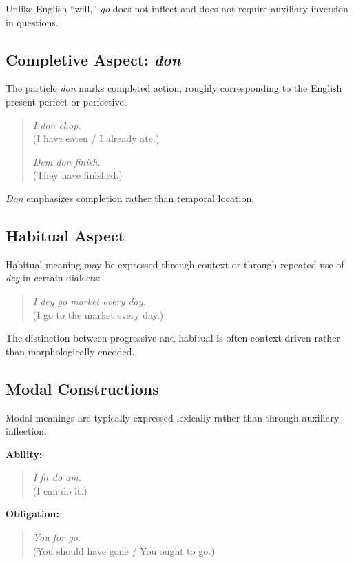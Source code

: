 \documentclass[12pt]{article}
\begin{document}
Unlike English “will,” \textit{go} does not inflect and does not require auxiliary inversion in questions.

\subsection{Completive Aspect: \textit{don}}

The particle \textit{don} marks completed action, roughly corresponding to the English present perfect or perfective.

\begin{quote}
\textit{I don chop.} \\
(I have eaten / I already ate.)

\textit{Dem don finish.} \\
(They have finished.)
\end{quote}

\textit{Don} emphasizes completion rather than temporal location.

\subsection{Habitual Aspect}

Habitual meaning may be expressed through context or through repeated use of \textit{dey} in certain dialects:

\begin{quote}
\textit{I dey go market every day.} \\
(I go to the market every day.)
\end{quote}

The distinction between progressive and habitual is often context-driven rather than morphologically encoded.

\subsection{Modal Constructions}

Modal meanings are typically expressed lexically rather than through auxiliary inflection.

\textbf{Ability:}

\begin{quote}
\textit{I fit do am.} \\
(I can do it.)
\end{quote}

\textbf{Obligation:}

\begin{quote}
\textit{You for go.} \\
(You should have gone / You ought to go.)
\end{quote}
\end{document}
